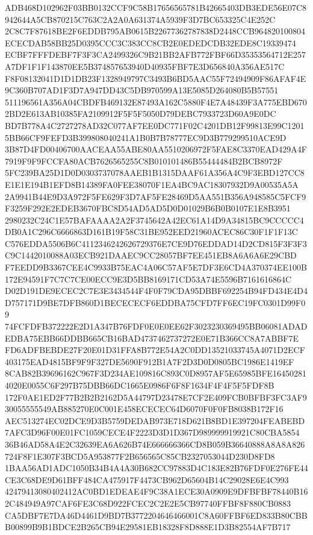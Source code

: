\documentclass[UTF8,fontset=fandol,zihao=-4,a4paper]{ctexart}
\begin{document}
{{ADB468D102962F03BB0132CCF9C58B17656565781B42665403DB3EDE56E07C8942644A5CB870215C763C2A2A0A631374A5939F3D7BC653325C4E252C
2C8C7F87618BE2F6EDDB795AB0615B22677362787838D2448CCB964820100804ECECDAB58BB25D0395CCC3C383CC8CB2E0EDEDCDB32EDE8C19339474
ECBF7FFFDEBF7F3F3CA2499326C9B21BB2AFB772FBF66D35353564712E257A7DF1F1F143870EE5B374857653940D40935FBF7E3D656840A356AE517C
F8F08132041D1D1DB23F1328949797C3493B6BD5AAC55F72494909F86AFAF4E9C360B707AD1F3D7A947DD43C5DB970599A13E5085D264080B5B57551
511196561A356A04CBDFB469132E87493A162C5880F4E7A48439F3A775EBD6702BD2E613AB10385FA2109912F5F5F5050D79DEBC7933723D60A9E0DC
BD7B778A4C2727278AD32C077AF7EE0DC771F02C4201DB12F99813E99C12015BB66CF9FEFD3B399808040241A1B0B7B78777EC9D3B779299510ACE9D
3B87D4FD00406700AACEAA55ABE80AA5510206972F5FAE8C3370EAD429A4F7919F9F9FCCFA80ACB7626565255C8B010101486B55444484B2BCB8972F
5FC239BA25D1D0D0303737078AAEB1B1315DAAF61A356A4C9F3EBD127CC8E1E1E194B1EFD8B14389FA0FEE38070F1EA4BC9AC18307932D9A00535A5A
2A9941B44E9D3A972F5FE629F3D7AF5FE28469D5AA551B356A948585C5FCF9F3259F292E2EDEB3670FBC8D54AD5AD5D0D01029B6B0B0107E1E8B3951
2980232C24C1E57BAFAAAA2A2F3745642A42EC61A14D9A34815BC9CCCCC4DB0A1C296C6666863D161B19F58C31BE952EED21960ACEC86C30F1F1F13C
C576EDDA5506B6C4112346242626729376E7CE9D76EDDAD14D2CD815F3F3F3C9C1442010088A03ECB921DAAEC9CC28057BF7EE451EB8A6A6A6E29CBD
F7EEDD9B3367CEE4C9933B75EAC4A06C57AF5E7DF3E6CD4A370374EE100B172E94591F7C7C7CE00ECC9E3D5BB8169171CD53A74E5596B7161616864C
D02D191DE9ECEC2C7E3E3434544F4F0F79CDA95DBBF692254B94FD434E4D4D757171D9BE7DFB860D1BECECECF6EDDBA75CFD7FF6EC19FC0301D99F09
74FCFDFB372222E2D1A347B76FDF0E0E0EE62F3023230369495BB06081ADADEDBA75EBB66DDBB665CB16BAD4737462737272E0E71B366CC8A7ABBF7E
FD6ADFBEBDE27F20E01D31FFA8B772E54A2C0DD13521033745A4071D2ECF403175EAD4815BF9F9F327DE5690F912B1A7F2D3D0D0805BC1986E1419EF
8CAB82B39696162C967F3D234AE109816C893C0D8957AF5E65985BFE164502814020E0055C6F297B75DBB66DC1665E0986F6F8F1634F4F4F5F5FDF8B
172F0AE1ED2F77B2B2B2162D5A44797D23478E7CF2E409FCB0BFBF3FC3AF930055555549AB885270E0C001E458ECECEC64D6070F0F0FB8038B172F16
AEC513274EC02DCE9D3B5759DEDAB973E718D621B8BD1E397204FEABEBD7AFC3D96F00E01FC1059CECE4F2223D3D1D367D989999919921C80CBA5854
36B46AD58A4E2C32639EA6A626B74E666666366CD8B059B36640888A8A8A826724F8F1E307F3BCD5A953877F2B656565C85CB2327053044D230D8FD8
1BAA56AD1ADC1050B34B4A4A30B682CC97883D4C183E82B76FDF0E276FE44CE3C68DE9D61BFF484CA475917F4473CB962D65604B14C29028E6E4C993
42479413080402412AC0BD1EDEAE4F9C38A1ECE30A0909E9DFBFBF78440B162C484949A97CAF6FE3C68D922FCEC2C2E2E5CB97740FFBF8F880CB0883
CA5DBF7E7DA46D4461D9BD7B3772204646466001C8A60FFBF6ED833B80CBBB00899B9B1BDCE2B265CB94E29581EB18328F8D888E1D3B82554AF7B717
}}
\end{document}
